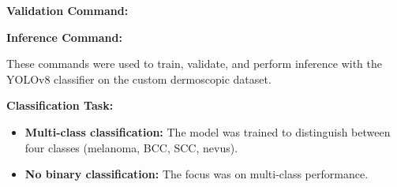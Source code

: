 \documentclass[a4paper,12pt]{report}
\begin{document}
\begin{spacing}{1.5}
    \textbf{Validation Command:}
    

    \textbf{Inference Command:}
    

    These commands were used to train, validate, and perform inference with the YOLOv8 classifier on the custom dermoscopic dataset.
        
    \textbf{Classification Task:}
    \begin{itemize}
        \item \textbf{Multi-class classification:} The model was trained to distinguish between four classes (melanoma, BCC, SCC, nevus).
        \item \textbf{No binary classification:} The focus was on multi-class performance.
    \end{itemize}
    

\end{spacing}
\end{document}
